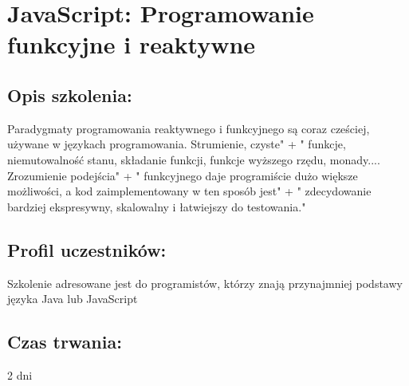 \documentclass{article}[10pt]
\begin{document}
\newpage


    
	\section{JavaScript: Programowanie funkcyjne i reaktywne}

	\subsection*{Opis szkolenia:}
	\begin{adjustwidth}{2cm}{}
\justifying
		Paradygmaty programowania reaktywnego i funkcyjnego są coraz cześciej, używane w językach programowania. Strumienie, czyste" +
        " funkcje, niemutowalność stanu, składanie funkcji, funkcje wyższego rzędu, monady.... Zrozumienie podejścia" +
        " funkcyjnego daje programiście dużo większe możliwości, a kod zaimplementowany w ten sposób jest" +
        " zdecydowanie bardziej ekspresywny, skalowalny i łatwiejszy do testowania." 
	\end{adjustwidth}
	\subsection*{Profil uczestników:}
\begin{adjustwidth}{2cm}{}
\justifying
	
Szkolenie adresowane jest do programistów, którzy znają przynajmniej podstawy języka Java lub JavaScript
\end{adjustwidth}
	\subsection*{Czas trwania:}
\begin{adjustwidth}{2cm}{}
	2 dni
\end{adjustwidth}
\end{document}
